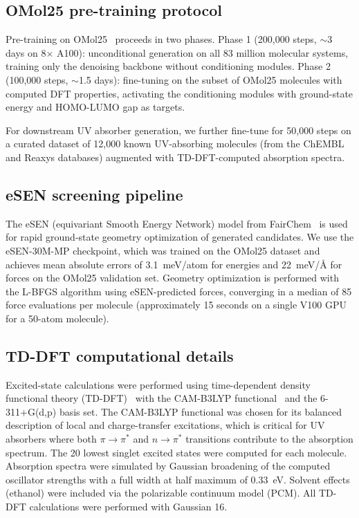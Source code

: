 \documentclass[11pt]{article}
\begin{document}
\subsection*{OMol25 pre-training protocol}

Pre-training on OMol25~\cite{omol25} proceeds in two phases. Phase 1 (200{,}000 steps, $\sim$3 days on 8$\times$ A100): unconditional generation on all 83 million molecular systems, training only the denoising backbone without conditioning modules. Phase 2 (100{,}000 steps, $\sim$1.5 days): fine-tuning on the subset of OMol25 molecules with computed DFT properties, activating the conditioning modules with ground-state energy and HOMO-LUMO gap as targets.

For downstream UV absorber generation, we further fine-tune for 50{,}000 steps on a curated dataset of 12{,}000 known UV-absorbing molecules (from the ChEMBL and Reaxys databases) augmented with TD-DFT-computed absorption spectra.


\subsection*{eSEN screening pipeline}

The eSEN (equivariant Smooth Energy Network) model from FairChem~\cite{fairchem2024, omol25} is used for rapid ground-state geometry optimization of generated candidates. We use the eSEN-30M-MP checkpoint, which was trained on the OMol25 dataset and achieves mean absolute errors of 3.1~meV/atom for energies and 22~meV/\AA{} for forces on the OMol25 validation set. Geometry optimization is performed with the L-BFGS algorithm using eSEN-predicted forces, converging in a median of 85 force evaluations per molecule (approximately 15 seconds on a single V100 GPU for a 50-atom molecule).


\subsection*{TD-DFT computational details}

Excited-state calculations were performed using time-dependent density functional theory (TD-DFT)~\cite{casida1995tddft} with the CAM-B3LYP functional~\cite{yanai2004camb3lyp} and the 6-311+G(d,p) basis set. The CAM-B3LYP functional was chosen for its balanced description of local and charge-transfer excitations, which is critical for UV absorbers where both $\pi\to\pi^*$ and $n\to\pi^*$ transitions contribute to the absorption spectrum. The 20 lowest singlet excited states were computed for each molecule. Absorption spectra were simulated by Gaussian broadening of the computed oscillator strengths with a full width at half maximum of 0.33~eV. Solvent effects (ethanol) were included via the polarizable continuum model (PCM). All TD-DFT calculations were performed with Gaussian 16.
\end{document}
